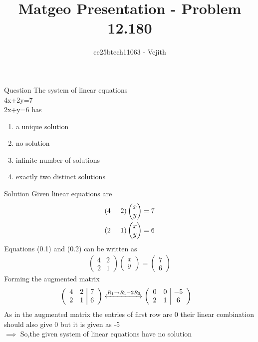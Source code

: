 \documentclass{beamer}
\title{Matgeo Presentation - Problem 12.180}
\author{ee25btech11063 - Vejith}
\numberwithin{equation}{section}
\providecommand{\brak}[1]{\ensuremath{\left(#1\right)}}
\theoremstyle{remark}
\newcommand{\myvec}[1]{\ensuremath{\begin{pmatrix}#1\end{pmatrix}}}
\begin{document}
\frame{\titlepage}
\begin{frame}{Question}
    The system of linear equations\\
\hspace*{3cm}4x+2y=7\\
\hspace*{3cm}2x+y=6  has 
\begin{multicols}{2}
\begin{enumerate}[label=\alph*)]
    \item a  unique solution
    \item no solution
    \item infinite number of solutions
    \item exactly two distinct solutions 
\end{enumerate}
\end{multicols}
\end{frame}

\begin{frame}{Solution}
    Given linear equations are
\begin{align}
    \brak{4\hspace{0.5cm} 2}\myvec{x\\y}=7\\
     \brak{2\hspace{0.5cm} 1}\myvec{x\\y}=6
\end{align}
Equations (0.1) and (0.2) can be written as
\begin{align}
    \begin{pmatrix}
        4 & 2\\
        2 & 1
    \end{pmatrix} \myvec{x\\y}=\myvec{7\\6}
\end{align}
Forming the augmented matrix
\begin{align}
     \left(\begin{array}{cc|c}
        4 & 2 & 7 \\
        2 & 1 & 6 
\end{array}\right) &\xleftrightarrow{R_1 \rightarrow R_1-2R_2}  \left(\begin{array}{cc|c}
        0 & 0 & -5 \\
        2 & 1 & 6 
\end{array}\right)
\end{align}
As in the augmented matrix the entries of first row are 0 their linear combination should also give 0 but it is  given as -5\\
$\implies$ So,the given system of linear equations have no solution
\end{frame}
\end{document}

